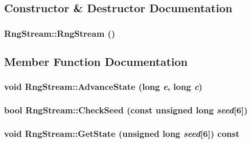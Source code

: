 \subsection{Constructor \& Destructor Documentation}
\hypertarget{classRngStream_c44014ddf4c23196a1a846067b0e7399}{
\subsubsection[{RngStream}]{\setlength{\rightskip}{0pt plus 5cm}RngStream::RngStream ()}}
\label{classRngStream_c44014ddf4c23196a1a846067b0e7399}




\subsection{Member Function Documentation}
\hypertarget{classRngStream_33e7544ccab8902fe6e9014a301f4ae3}{
\subsubsection[{AdvanceState}]{\setlength{\rightskip}{0pt plus 5cm}void RngStream::AdvanceState (long {\em e}, \/  long {\em c})}}
\label{classRngStream_33e7544ccab8902fe6e9014a301f4ae3}


\hypertarget{classRngStream_e68a1093e1b53b5d461e44535f3c3170}{
\subsubsection[{CheckSeed}]{\setlength{\rightskip}{0pt plus 5cm}bool RngStream::CheckSeed (const unsigned long {\em seed}\mbox{[}6\mbox{]})}}
\label{classRngStream_e68a1093e1b53b5d461e44535f3c3170}


\hypertarget{classRngStream_2549af41becd68ac560a26614878aac8}{
\subsubsection[{GetState}]{\setlength{\rightskip}{0pt plus 5cm}void RngStream::GetState (unsigned long {\em seed}\mbox{[}6\mbox{]}) const}}
\label{classRngStream_2549af41becd68ac560a26614878aac8}


